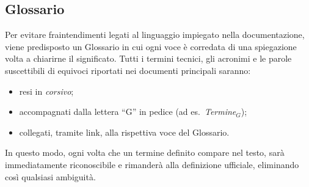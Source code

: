 \subsection{Glossario}
Per evitare fraintendimenti legati al linguaggio impiegato nella documentazione, viene predisposto un Glossario in cui ogni voce è corredata di una spiegazione volta a chiarirne il significato. Tutti i termini tecnici, gli acronimi e le parole suscettibili di equivoci riportati nei documenti principali saranno:

\begin{itemize}
  \item resi in \textit{corsivo};
  \item accompagnati dalla lettera “G” in pedice (ad es.\ \textit{Termine}$_G$);
  \item collegati, tramite link, alla rispettiva voce del Glossario.
\end{itemize}

In questo modo, ogni volta che un termine definito compare nel testo, sarà immediatamente riconoscibile e rimanderà alla definizione ufficiale, eliminando così qualsiasi ambiguità.
